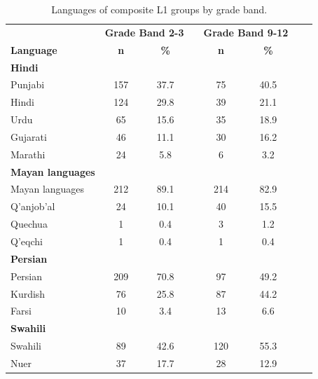 \documentclass [PhD] {uclathes}
\begin{document}
\begin{table}[htbp]
\centering
\caption{\label{lang_grp} Languages of composite L1 groups by grade band.}
\scriptsize  %
\begin{tabular}{lccccccc}
\toprule
    & \multicolumn{2}{c}{\textbf{Grade Band 2-3}} & \multicolumn{1}{c}{ } & \multicolumn{2}{c}{\textbf{Grade Band 9-12}} \\
    \cline{2-3}
    \cline{5-6}
     \textbf{Language} & \textbf{n} & \textbf{\%} & & \textbf{n} & \textbf{\%} \\
    \midrule
\textbf{Hindi} & & & & & \\
\hspace{3mm} Punjabi & 157 & 37.7 & & 75 & 40.5 \\
\hspace{3mm} Hindi & 124 & 29.8 & & 39 & 21.1 \\
\hspace{3mm} Urdu & 65 & 15.6 & & 35 & 18.9 \\
\hspace{3mm} Gujarati & 46 & 11.1 & & 30 & 16.2 \\
\hspace{3mm} Marathi & 24 & 5.8 & & 6 & 3.2 \\
\textbf{Mayan languages} & & & & & \\
\hspace{3mm} Mayan languages & 212 & 89.1 & & 214 & 82.9 \\
\hspace{3mm} Q'anjob'al & 24 & 10.1 & & 40 & 15.5 \\
\hspace{3mm} Quechua & 1 & 0.4 & & 3 & 1.2 \\
\hspace{3mm} Q'eqchi & 1 & 0.4 & & 1 & 0.4 \\
\textbf{Persian} & & & & & \\
\hspace{3mm} Persian & 209 & 70.8 & & 97 & 49.2 \\
\hspace{3mm} Kurdish & 76 & 25.8 & & 87 & 44.2 \\
\hspace{3mm} Farsi & 10 & 3.4 & & 13 & 6.6 \\
\textbf{Swahili} & & & & & \\
\hspace{3mm} Swahili & 89 & 42.6 & & 120 & 55.3 \\
\hspace{3mm} Nuer & 37 & 17.7 & & 28 & 12.9 \\

\end{tabular}
\end{table}
\end{document}
